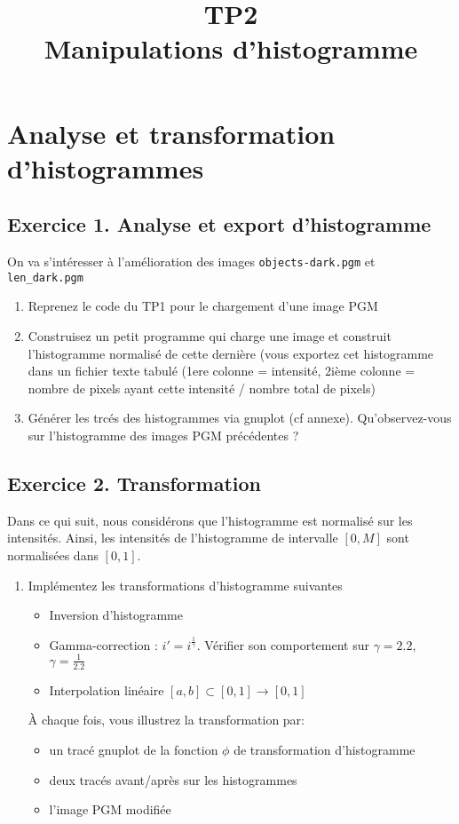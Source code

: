 \documentclass[a4paper, 11pt, french]{article}
\title{\bf{TP2 \\ Manipulations d'histogramme}}
\author{}
\date{}
\begin{document}
\maketitle


\section*{\bf Analyse et transformation d'histogrammes}

\subsection*{\bf Exercice 1. \rm Analyse et export d'histogramme}

\par On va s'intéresser à l'amélioration des images \texttt{objects-dark.pgm} et \texttt{len\_dark.pgm}

\begin{enumerate}
	\item Reprenez le code du TP1 pour le chargement d'une image PGM
	\item Construisez un petit programme qui charge une image et construit l'histogramme normalisé de cette dernière (vous exportez cet histogramme dans un fichier texte tabulé (1ere colonne = intensité, 2ième colonne = nombre de pixels ayant cette intensité / nombre total de pixels)
	\item Générer les trcés des histogrammes via gnuplot (cf annexe). Qu'observez-vous sur l'histogramme des images PGM précédentes ? 
\end{enumerate}

\subsection*{\bf Exercice 2. \rm Transformation}

Dans ce qui suit, nous considérons que l'histogramme est normalisé sur les intensités. Ainsi, les intensités de l'histogramme de intervalle $[0,M]$ sont normalisées dans $[0,1]$.

\begin{enumerate}
	\item Implémentez les transformations d'histogramme suivantes 
	\begin{itemize}
		\item Inversion d'histogramme
		\item Gamma-correction :  $i' = i^\frac{1}{\gamma}$. Vérifier son comportement sur $\gamma=2.2$, $\gamma=\frac{1}{2.2}$ 
		\item Interpolation linéaire $[a,b]\subset[0,1]\rightarrow [0,1]$
	\end{itemize}
À chaque fois, vous illustrez la transformation par:
\begin{itemize}
	\item un tracé gnuplot de la fonction $\phi$ de transformation d'histogramme
	\item deux tracés avant/après sur les histogrammes
	\item l'image PGM modifiée
\end{itemize}
\end{enumerate}
\end{document}
